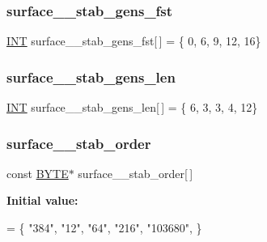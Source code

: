 \subsubsection{\texorpdfstring{surface\+\_\+\_\+stab\+\_\+gens\+\_\+fst}{surface\_16\_stab\_gens\_fst}}
{\footnotesize\ttfamily \mbox{\hyperlink{galois_8h_a09fddde158a3a20bd2dcadb609de11dc}{I\+NT}} surface\+\_\+\_\+stab\+\_\+gens\+\_\+fst\mbox{[}$\,$\mbox{]} = \{ 0, 6, 9, 12, 16\}}

\mbox{\label{surface__16_8_c_aaa8be814e9a2d886ff2ddfc693e18d16}} 
\subsubsection{\texorpdfstring{surface\+\_\+\_\+stab\+\_\+gens\+\_\+len}{surface\_16\_stab\_gens\_len}}
{\footnotesize\ttfamily \mbox{\hyperlink{galois_8h_a09fddde158a3a20bd2dcadb609de11dc}{I\+NT}} surface\+\_\+\_\+stab\+\_\+gens\+\_\+len\mbox{[}$\,$\mbox{]} = \{ 6, 3, 3, 4, 12\}}

\mbox{\label{surface__16_8_c_aaac2c3eb182f3ae12b1376fd55acb212}} 
\subsubsection{\texorpdfstring{surface\+\_\+\_\+stab\+\_\+order}{surface\_16\_stab\_order}}
{\footnotesize\ttfamily const \mbox{\hyperlink{galois_8h_ab6cc7b4aeb6ea31aba2b3fbfc83ff5e6}{B\+Y\+TE}}$\ast$ surface\+\_\+\_\+stab\+\_\+order\mbox{[}$\,$\mbox{]}}

{\bfseries Initial value\+:}
\begin{DoxyCode}
= \{
    \textcolor{stringliteral}{"384"},
    \textcolor{stringliteral}{"12"},
    \textcolor{stringliteral}{"64"},
    \textcolor{stringliteral}{"216"},
    \textcolor{stringliteral}{"103680"},
\}
\end{DoxyCode}
